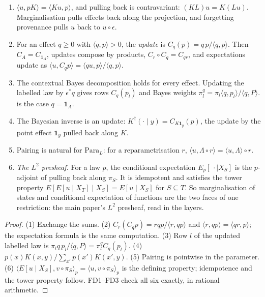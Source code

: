 \documentclass[11pt]{article}
\theoremstyle{definition}\newtheorem{definition}[theorem]{Definition}\newtheorem{remark}[theorem]{Remark}\newtheorem{example}[theorem]{Example}
\begin{document}
\begin{proposition}\label{prop:effects}
\begin{enumerate}
\item[(1)] $\langle u,pK\rangle=\langle Ku,p\rangle$, and pulling back is contravariant: $(KL)u=K(Lu)$. Marginalisation pulls effects back along the
  projection, and forgetting provenance pulls $u$ back to $u\circ\epsilon$.
\item[(2)] For an effect $q\ge0$ with $\langle q,p\rangle>0$, the \emph{update} is $C_q(p)=q\,p/\langle q,p\rangle$. Then $C_A=C_{\mathbf 1_A}$, updates compose by products,
  $C_r\circ C_q=C_{qr}$, and expectations update as $\langle u,C_qp\rangle=\langle qu,p\rangle/\langle q,p\rangle$.
\item[(3)] The contextual Bayes decomposition holds for every effect. Updating the labelled law by $\epsilon^*q$ gives rows $C_q(p_l)$ and Bayes weights
  $\pi^q_l=\pi_l\langle q,p_l\rangle/\langle q,P\rangle$.  is the case $q=\mathbf 1_A$.
\item[(4)] The Bayesian inverse is an update: $K^\dagger(\cdot\mid y)=C_{K\mathbf 1_y}(p)$, the update by the point effect $\mathbf 1_y$ pulled back along $K$.
\item[(5)] Pairing is natural for $\mathrm{Para}_L$: for a reparametrisation $r$, $\langle u,\Lambda\circ r\rangle=\langle u,\Lambda\rangle\circ r$.
\item[(6)] \emph{The $L^2$ presheaf.} For a law $p$, the conditional expectation $E_p[\,\cdot\mid X_S]$ is the $p$-adjoint of pulling back along $\pi_S$. It is
  idempotent and satisfies the tower property $E[E[u\mid X_T]\mid X_S]=E[u\mid X_S]$ for $S\subseteq T$. So marginalisation of states and conditional
  expectation of functions are the two faces of one restriction: the main paper's $L^2$ presheaf, read in the layers.
\end{enumerate}
\end{proposition}

\begin{proof}
(1) Exchange the sums. (2) $C_r(C_qp)=rqp/\langle r,qp\rangle$ and $\langle r,qp\rangle=\langle qr,p\rangle$; the expectation formula is the same computation. (3) Row $l$ of the
updated labelled law is $\pi_lq\,p_l/\langle q,P\rangle=\pi^q_lC_q(p_l)$. (4) $p(x)K(x,y)/\sum_{x'}p(x')K(x',y)$. (5) Pairing is pointwise in the parameter.
(6) $\langle E[u\mid X_S],v\circ\pi_S\rangle_p=\langle u,v\circ\pi_S\rangle_p$ is the defining property; idempotence and the tower property follow. FD1--FD3 check
all six exactly, in rational arithmetic.
\end{proof}
\end{document}
